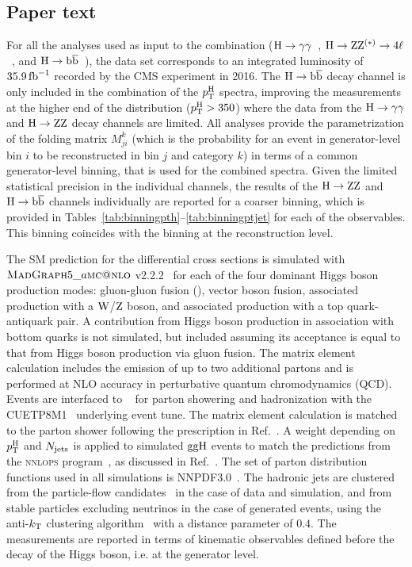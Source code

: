

\subsection{Paper text}

For all the analyses used as input to the combination ($\mathrm{H}\to\mathrm{\gamma}\mathrm{\gamma}$~\cite{Sirunyan:2018kta}, $\mathrm{H}\to\mathrm{Z}\mathrm{Z}^{(\ast)}\to 4\ell$~\cite{CMS_AN_2016-442}, and $\mathrm{H}\to\mathrm{b}\overline{\mathrm{b}}$~\cite{CMS_AN_2016-366}), the data set corresponds to an integrated luminosity of $35.9\,\text{fb}^{-1}$ recorded by the CMS experiment in 2016.
The $\mathrm{H}\to\mathrm{b}\overline{\mathrm{b}}$ decay channel is only included in the combination of the $p_\mathrm{T}^\mathrm{H}$ spectra, improving the measurements at the higher end of the distribution ($p_\mathrm{T}^\mathrm{H} > 350$\GeV) where the data from the $\mathrm{H}\to\mathrm{\gamma}\mathrm{\gamma}$ and $\mathrm{H}\to\mathrm{Z}\mathrm{Z}$ decay channels are limited.
All analyses provide the parametrization of the folding matrix $M_{ji}^{k}$ (which is the probability for an event in generator-level bin $i$ to be reconstructed in bin $j$ and category $k$) in terms of a common generator-level binning, that is used for the combined spectra.
Given the limited statistical precision in the individual channels, the results of the $\mathrm{H}\to\mathrm{Z}\mathrm{Z}$ and $\mathrm{H}\to\mathrm{b}\overline{\mathrm{b}}$ channels individually are reported for a coarser binning, which is provided in Tables~\ref{tab:binningpth}--\ref{tab:binningptjet} for each of the observables.
This binning coincides with the binning at the reconstruction level.


The SM prediction for the differential cross sections is simulated with $\textsc{MadGraph}{}5\_a\textsc{mc@nlo}$ v2.2.2~\cite{Alwall:2014hca} for each of the four dominant Higgs boson production modes: gluon-gluon fusion (\ggh), vector boson fusion, associated production with a $\mathrm{W}$/$\mathrm{Z}$ boson, and associated production with a top quark-antiquark pair.
A contribution from Higgs boson production in association with bottom quarks is not simulated, but included assuming its acceptance is equal to that from Higgs boson production via gluon fusion.
The matrix element calculation includes the emission of up to two additional partons and is performed at NLO accuracy in perturbative quantum chromodynamics (QCD).
Events are interfaced to ~\cite{Sjostrand:2014zea} for parton showering and hadronization with the CUETP8M1~\cite{Skands:1695787} underlying event tune.
The matrix element calculation is matched to the parton shower following the prescription in Ref.~\cite{Frederix:2012ps}.
A weight depending on $p_\mathrm{T}^\mathrm{H}$ and $N_\text{jets} $ is applied to simulated $\mathrm{g}\mathrm{g}\mathrm{H}$ events to match the predictions from the {\textsc{nnlops}} program~\cite{Hamilton:2012np, Kardos:2014dua}, as discussed in Ref.~\cite{Sirunyan:2018koj}.
The set of parton distribution functions used in all simulations is NNPDF3.0~\cite{Ball:2014uwa}.
The hadronic jets are clustered from the particle-flow candidates~\cite{Sirunyan:2017ulk} in the case of data and simulation, and from stable particles excluding neutrinos in the case of generated events, using the anti-$k_\mathrm{T}$ clustering algorithm~\cite{Cacciari:2008gp} with a distance parameter of $0.4$.
The measurements are reported in terms of kinematic observables defined before the decay of the Higgs boson, i.e. at the generator level.


